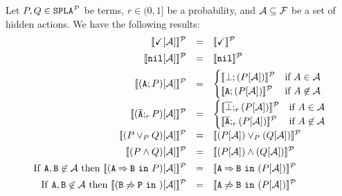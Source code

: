 \bprop
  Let $P,Q\in\mathtt{SPLA{^{\cal P}}}$ be terms, $r\in (0,1]$ be a probability, and
  ${\cal A}\subseteq{\cal F}$ be a set of hidden actions. We have the following results:
  $$\begin{array}{rll} 
  \semdenp{\checkmark\hide\calA}&=&\semdenp{\checkmark}\\[0.5em]
  \semdenp{\nil\hide\calA}&=&\semdenp{\nil}\\[0.5em]
  \semdenp{(\fA;P)\hide\calA}&=&
      \begin{cases}
        \semdenp{\bot;(P\hide\calA)} & \mbox{if } A\in\calA\\
        \semdenp{\fA;(P\hide\calA)} & \mbox{if } A\not\in\calA\\
      \end{cases}\\[1em]
  \semdenp{(\ofA;_rP)\hide\calA}&=&
      \begin{cases}
        \semdenp{\overline{\bot};_r(P\hide\calA)} & \mbox{if } A\in\calA\\
        \semdenp{\ofA;_r(P\hide\calA)} & \mbox{if } A\not\in\calA\\
      \end{cases}\\[1em]
  \semdenp{(P\choice_P Q)\hide\calA}&=&\semdenp{(P\hide\calA)\choice_P (Q\hide\calA)}\\[0.5em]
  \semdenp{(P\paral Q)\hide\calA}&=&\semdenp{(P\hide\calA)\paral (Q\hide\calA)}\\[0.5em]
  \mathrm{If\ } \fA,\fB\not\in\calA \mathrm{\ then\ }
    \semdenp{(\require{A}{B}{P})\hide\calA}&=&\semdenp{\require{A}{B}{(P\hide\calA)}}\\[0.5em]
  \mathrm{If\ } \fA,\fB\not\in\calA \mathrm{\ then\ }
    \semdenp{(\exclude{B}{P})\hide\calA}&=&\semdenp{\exclude{A}{B}{(P\hide\calA)}}
  \end{array}$$
\eprop


